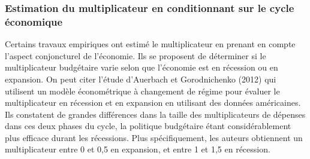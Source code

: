 \documentclass[12pt,letterpaper]{article}
\begin{document}
\subsubsection{Estimation du multiplicateur en conditionnant sur le cycle économique}

Certains travaux empiriques ont estimé le multiplicateur en prenant en compte l’aspect conjoncturel de l’économie. Ils se proposent de déterminer si le multiplicateur budgétaire varie selon que l’économie est en récession ou en expansion. On peut citer l’étude d’Auerbach et Gorodnichenko (2012) qui utilisent un modèle économétrique à changement de régime pour évaluer le multiplicateur en récession et en expansion en utilisant des données américaines. Ils constatent de grandes différences dans la taille des multiplicateurs de dépenses dans ces deux phases du cycle, la politique budgétaire étant considérablement plus efficace durant les récessions. Plus spécifiquement, les auteurs obtiennent un multiplicateur entre 0 et 0,5 en expansion, et entre 1 et 1,5 en récession.
\end{document}

